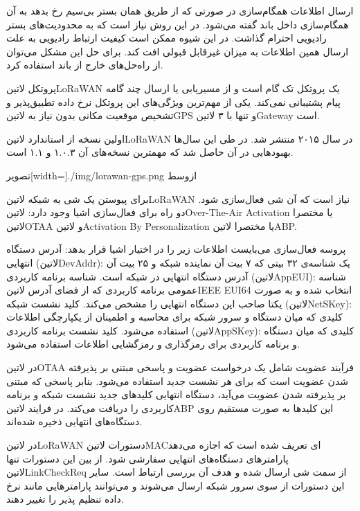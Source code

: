 ارسال اطلاعات همگام‌سازی در صورتی که از طریق همان بستر بی‌سیم رخ بدهد به آن همگام‌سازی داخل باند گفته می‌شود. در این روش نیاز است که به محدودیت‌های بستر رادیویی احترام گذاشت.
در این شیوه ممکن است کیفیت ارتباط رادیویی به علت ارسال همین اطلاعات به میزان غیرقابل قبولی افت کند. برای حل این مشکل می‌توان از راه‌حل‌های خارج از باند استفاده کرد.

پروتکل ‌لاتین{LoRaWAN} یک پروتکل تک گام است و از مسیریابی یا ارسال چند گامه پیام پشتیبانی نمی‌کند. یکی از مهم‌ترین ویژگی‌های این پروتکل نرخ داده تطبیق‌پذیر و تشخیص
موقعیت مکانی بدون نیاز به ‌لاتین{GPS} و تنها با ۳ ‌لاتین{Gateway} است.

اولین نسخه از استاندارد ‌لاتین{LoRaWAN} در سال ۲۰۱۵ منتشر شد. در طی این سال‌ها بهبودهایی در آن حاصل شد که مهمترین نسخه‌های آن ۱.۰.۳ و ۱.۱ است.

‌تصویر[width=\textwidth]{./img/lorawan-gps.png}
‌ازوسط

برای پیوستن یک شی به شبکه ‌لاتین{LoRaWAN} نیاز است که آن شی فعال‌سازی شود. دو راه برای فعال‌سازی اشیا وجود دارد: ‌لاتین{Over-The-Air Activation} یا مختصرا ‌لاتین{OTAA}
و ‌لاتین{Activation By Personalization} یا مختصرا ‌لاتین{ABP}.

پروسه فعال‌سازی می‌بایست اطلاعات زیر را در اختیار اشیا قرار بدهد:
 آدرس دستگاه انتهایی (‌لاتین{DevAddr}): یک شناسه‌ی ۳۲ بیتی که ۷ بیت آن نماینده شبکه و ۲۵ بیت آن آدرس دستگاه انتهایی در شبکه است.
 شناسه برنامه کاربردی (‌لاتین{AppEUI}): شناسه عمومی برنامه کاربردی که از فضای آدرس ‌لاتین{IEEE EUI64} انتخاب شده و به صورت یکتا صاحب این دستگاه انتهایی را مشخص می‌کند.
 کلید نشست شبکه (‌لاتین{NetSKey}): کلیدی که میان دستگاه و سرور شبکه برای محاسبه و اطمینان از یکپارچگی اطلاعات استفاده می‌شود.
 کلید نشست برنامه کاربردی (‌لاتین{AppSKey}): کلیدی که میان دستگاه و برنامه کاربردی برای رمزگذاری و رمزگشایی اطلاعات استفاده می‌شود.

در ‌لاتین{OTAA} فرآیند عضویت شامل یک درخواست عضویت و پاسخی مبتنی بر پذیرفته شدن عضویت است که برای هر نشست جدید استفاده می‌شود.
بنابر پاسخی که مبتنی بر پذیرفته شدن عضویت می‌آید، دستگاه انتهایی کلیدهای جدید نشست شبکه و برنامه کاربردی را دریافت می‌کند.
در فرایند ‌لاتین{ABP} این کلیدها به صورت مستقیم روی دستگاه‌های انتهایی ذخیره شده‌اند.

در ‌لاتین{LoRaWAN} دستورات ‌لاتین{MAC}ای تعریف شده است که اجازه می‌دهد پارامترهای دستگاه‌های انتهایی سفارشی شود.
از بین این دستورات تنها ‌لاتین{LinkCheckReq} از سمت شی ارسال شده و هدف آن بررسی ارتباط است.
سایر این دستورات از سوی سرور شبکه ارسال می‌شوند و می‌توانند پارامترهایی مانند نرخ داده تنظیم پذیر را تغییر دهند.

